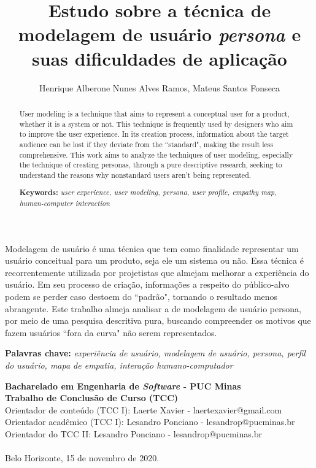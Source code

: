 \documentclass[12pt]{article}
\title{Estudo sobre a técnica de modelagem de usuário \emph{persona} e suas dificuldades de aplicação}
\author{Henrique Alberone Nunes Alves Ramos\inst{1}, Mateus Santos Fonseca\inst{1} }
\begin{document}
 

\maketitle

\begin{abstract}
  \par User modeling is a technique that aims to represent a conceptual user for a product, whether it is a system or not. This technique is frequently used by designers who aim to improve the user experience. In its creation process, information about the target audience can be lost if they deviate from the ``standard", making the result less comprehensive. This work aims to analyze the techniques of user modeling, especially the technique of creating personas, through a pure descriptive research, seeking to understand the reasons why nonstandard users aren't being represented.
  \vskip0.1in
  \par \textbf{Keywords:} \emph{user experience, user modeling, persona, user profile, empathy map, human-computer interaction}
  

\end{abstract}
     
\begin{resumo} 
    \par Modelagem de usuário é uma técnica que tem como finalidade representar um usuário conceitual para um produto, seja ele um sistema ou não. Essa técnica é recorrentemente utilizada por projetistas que almejam melhorar a experiência do usuário. Em seu processo de criação, informações a respeito do público-alvo podem se perder caso destoem do ``padrão", tornando o resultado menos abrangente. Este trabalho almeja analisar a de modelagem de usuário persona, por meio de uma pesquisa descritiva pura, buscando compreender os motivos que fazem usuários ``fora da curva" não serem representados.
    \vskip0.1in
    \par \textbf{Palavras chave:} \emph{experiência de usuário, modelagem de usuário, persona, perfil do usuário, mapa de empatia, interação humano-computador}
\end{resumo}

\begin{tcolorbox}
\footnotesize
\textbf{Bacharelado em Engenharia de \emph{Software} - PUC Minas\\
Trabalho de Conclusão de Curso (TCC)} \\

\indent Orientador de conteúdo (TCC I): Laerte Xavier - laertexavier@gmail.com\\
Orientador acadêmico (TCC I): Lesandro Ponciano - lesandrop@pucminas.br\\
Orientador do TCC II: Lesandro Ponciano - lesandrop@pucminas.br\\ \\
Belo Horizonte, 15 de novembro de 2020.
\end{tcolorbox}
\end{document}
